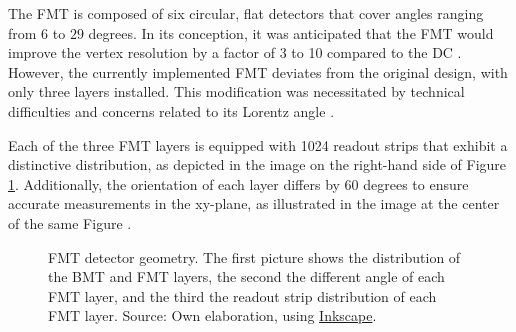     The FMT is composed of six circular, flat detectors that cover angles ranging from $6$ to $29$ degrees.
    In its conception, it was anticipated that the FMT would improve the vertex resolution by a factor of 3 to 10 compared to the DC \cite{aune2009}.
    However, the currently implemented FMT deviates from the original design, with only three layers installed.
    This modification was necessitated by technical difficulties and concerns related to its Lorentz angle \cite{konczykowski2010}.

    Each of the three FMT layers is equipped with 1024 readout strips that exhibit a distinctive distribution, as depicted in the image on the right-hand side of Figure \ref{fig::12.10::fmt_geometry}.
    Additionally, the orientation of each layer differs by 60 degrees to ensure accurate measurements in the xy-plane, as illustrated in the image at the center of the same Figure \cite{acker2020mvt}.

    \begin{figure}[t]
        \centering{}
        \caption[FMT detector geometry.]{FMT detector geometry. The first picture shows the distribution of the BMT and FMT layers, the second the different angle of each FMT layer, and the third the readout strip distribution of each FMT layer.
        Source: Own elaboration, using \href{https://inkscape.org/}{Inkscape}.}
        \label{fig::12.10::fmt_geometry}
    \end{figure}

    
